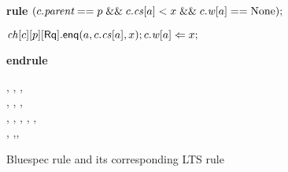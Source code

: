 \begin{figure}[t]
\centering
\begin{boxedminipage}{\columnwidth}
\small
\noindent \textbf{rule} $(c.\textit{parent} == p \; \mathit{\&\&} \; c.\mathit{cs}[a] < x \; \mathit{\&\&} \; c.\mathit{w}[a]== \textrm{None});$

\hspace{1cm} $\mathit{ch}[c][p][\mathsf{Rq}].\mathsf{enq}(a,c.\mathit{cs}[a],x); c.\mathit{w}[a] \Leftarrow x;$

\textbf{endrule}
\end{boxedminipage}
\begin{boxedminipage}{\columnwidth}
\small
{}
{
{\dt, \ch, \s,\\ \dst, \wt, \dwt,\\ \inp, \outp}
{\dt, , \s, \dst,\\
\wt[(c,a)\coloneqq x], \dwt,\inp, \outp}{}}
\end{boxedminipage}
\caption{Bluespec rule and its corresponding LTS rule}
\label{both}
\end{figure}





